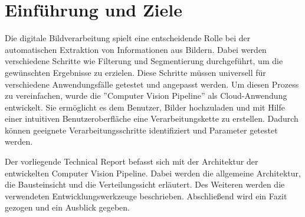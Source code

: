 \section{Einführung und Ziele}
Die digitale Bildverarbeitung spielt eine entscheidende Rolle bei der automatischen Extraktion von Informationen aus Bildern. Dabei werden verschiedene Schritte wie Filterung und Segmentierung durchgeführt, um die gewünschten Ergebnisse zu erzielen. Diese Schritte müssen universell für verschiedene Anwendungsfälle getestet und angepasst werden. Um diesen Prozess zu vereinfachen, wurde die ''Computer Vision Pipeline'' als Cloud-Anwendung entwickelt. Sie ermöglicht es dem Benutzer, Bilder hochzuladen und mit Hilfe einer intuitiven Benutzeroberfläche eine Verarbeitungskette zu erstellen. Dadurch können geeignete Verarbeitungsschritte identifiziert und Parameter getestet werden.

Der vorliegende Technical Report befasst sich mit der Architektur der entwickelten Computer Vision Pipeline. Dabei werden die allgemeine Architektur, die Bausteinsicht und die Verteilungssicht erläutert. Des Weiteren werden die verwendeten Entwicklungswerkzeuge beschrieben. Abschließend wird ein Fazit gezogen und ein Ausblick gegeben.